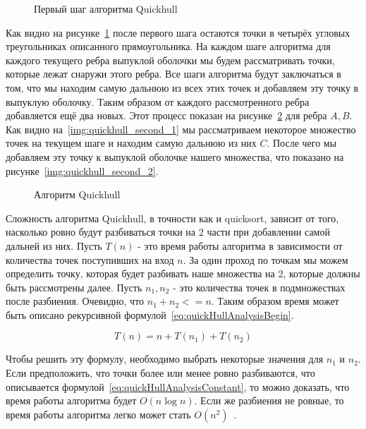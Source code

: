 \begin{figure}[H]
	\centering
	
	\caption{Первый шаг алгоритма Quickhull}
	\label{img:quickhull_first}
\end{figure}

Как видно на рисунке~\ref{img:quickhull_first} после первого шага остаются точки в четырёх угловых треугольниках описанного прямоугольника. На каждом шаге алгоритма для каждого текущего ребра выпуклой оболочки мы будем рассматривать точки, которые лежат снаружи этого ребра. Все шаги алгоритма будут заключаться в том, что мы находим самую дальнюю из всех этих точек и добавляем эту точку в выпуклую оболочку. Таким образом от каждого рассмотренного ребра добавляется ещё два новых. Этот процесс показан на рисунке~\ref{img:quickhull_second} для ребра $A, B$. Как видно на~\ref{img:quickhull_second_1} мы рассматриваем некоторое множество точек на текущем шаге и находим самую дальнюю из них $C$. После чего мы добавляем эту точку к выпуклой оболочке нашего множества, что показано на рисунке~\ref{img:quickhull_second_2}.

\begin{figure}[H]
	{\centering
		\hfill
		\subbottom[\label{img:quickhull_second_1}]{%
			}
		\hfill
		\subbottom[\label{img:quickhull_second_2}]{%
			}
		\hfill
	}
	\caption{Алгоритм Quickhull}
	\label{img:quickhull_second}
\end{figure}

Сложность алгоритма Quickhull, в точности как и quicksort, зависит от того, насколько ровно будут разбиваться точки на 2 части при добавлении самой дальней из них. Пусть $T(n)$ - это время работы алгоритма в зависимости от количества точек поступивших на вход $n$. За один проход по точкам мы можем определить точку, которая будет разбивать наше множества на 2, которые должны быть рассмотрены далее. Пусть $n_1, n_2$ - это количества точек в подмножествах после разбиения. Очевидно, что $n_1+n_2<=n$. Таким образом время может быть описано рекурсивной формулой~\ref{eq:quickHullAnalysisBegin}.

\begin{equation}\label{eq:quickHullAnalysisBegin}
T(n) = n + T(n_1) + T(n_2)
\end{equation}

Чтобы решить эту формулу, необходимо выбрать некоторые значения для $n_1$ и $n_2$. Если предположить, что точки более или менее ровно разбиваются, что описывается формулой~\ref{eq:quickHullAnalysisConstant}, то можно доказать, что время работы алгоритма будет $O(n \log n)$. Если же разбиения не ровные, то время работы алгоритма легко может стать $O(n^2)$~\cite{mount2000lecture}.

